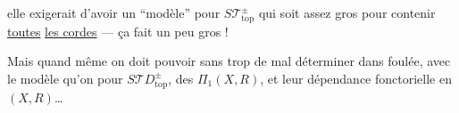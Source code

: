 elle exigerait d'avoir un ``modèle'' pour $S\mathcal T_{\mathrm{top}}^\pm$ qui soit assez gros pour contenir  \uline{toutes} \uline{les cordes} --- ça fait un peu gros !

Mais quand même on doit pouvoir sans trop de mal déterminer dans  foulée, avec le modèle qu'on  pour $S\mathcal TD_{\mathrm{top}}^\pm$, des  $\Pi_1(X,R)$, et leur dépendance fonctorielle en $(X,R)$\ldots
{}
